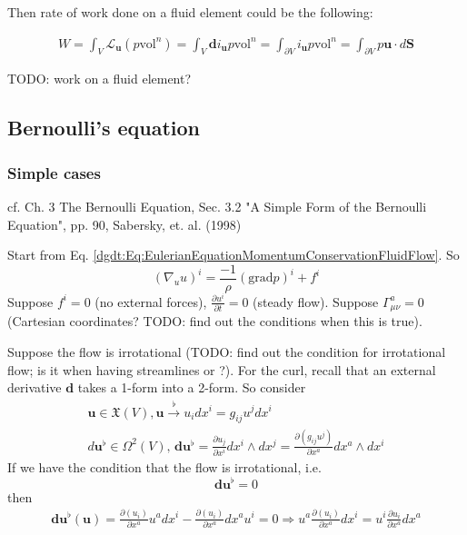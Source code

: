 Then rate of work done on a fluid element could be the following:

\[
\begin{gathered}
W = \int_V \mathcal{L}_{\mathbf{u}}(p \text{vol}^n) = \int_V \mathbf{d} i_{\mathbf{u}} p \text{vol}^n = \int_{\partial V} i_{\mathbf{u}} p \text{vol}^n = \int_{\partial V} p \mathbf{u} \cdot d\mathbf{S} 
\end{gathered}
\]

TODO: work on a fluid element?

\subsection{Bernoulli's equation}

\subsubsection{Simple cases}

cf. Ch. 3 The Bernoulli Equation, Sec. 3.2 "A Simple Form of the Bernoulli Equation", pp. 90, Sabersky, et. al. (1998) \cite{dgdt:SAHG1998}


Start from Eq. \ref{dgdt:Eq:EulerianEquationMomentumConservationFluidFlow}. So
\[
(\nabla_u u)^i = \frac{-1}{\rho} (\text{grad}p)^i + f^i
\]
Suppose $f^i=0$ (no external forces), $\frac{\partial u^i}{\partial t} = 0$ (steady flow). Suppose $\Gamma^a_{\mu \nu} =0$ (Cartesian coordinates? TODO: find out the conditions when this is true).

Suppose the flow is irrotational (TODO: find out the condition for irrotational flow; is it when having streamlines or ?). For the curl, recall that an external derivative $\mathbf{d}$ takes a 1-form into a 2-form. So consider
\[
\begin{gathered}
 \mathbf{u} \in \mathfrak{X}(V), \mathbf{u} \xrightarrow{\flat} u_i dx^i = g_{ij} u^j dx^i \\ 
 d\mathbf{u}^{\flat} \in \Omega^2(V), \, \mathbf{d}\mathbf{u}^{\flat} = \frac{\partial u_j}{\partial x^i} dx^i \wedge dx^j = \frac{ \partial (g_{ij} u^j) }{\partial x^a} dx^a \wedge dx^i
\end{gathered}
\]
If we have the condition that the flow is irrotational, i.e. 
\begin{equation}
\mathbf{d}\mathbf{u}^{\flat} = 0
\end{equation}
then
\[
\begin{gathered}
	\mathbf{d}\mathbf{u}^{\flat} (\mathbf{u}) = \frac{\partial (u_i) }{ \partial x^a} u^a dx^i - \frac{\partial (u_i) }{ \partial x^a} dx^a u^i = 0 \Longrightarrow u^a \frac{ \partial (u_i) }{ \partial x^a} dx^i = u^i \frac{\partial u_i}{ \partial x^a} dx^a
\end{gathered}
\]







